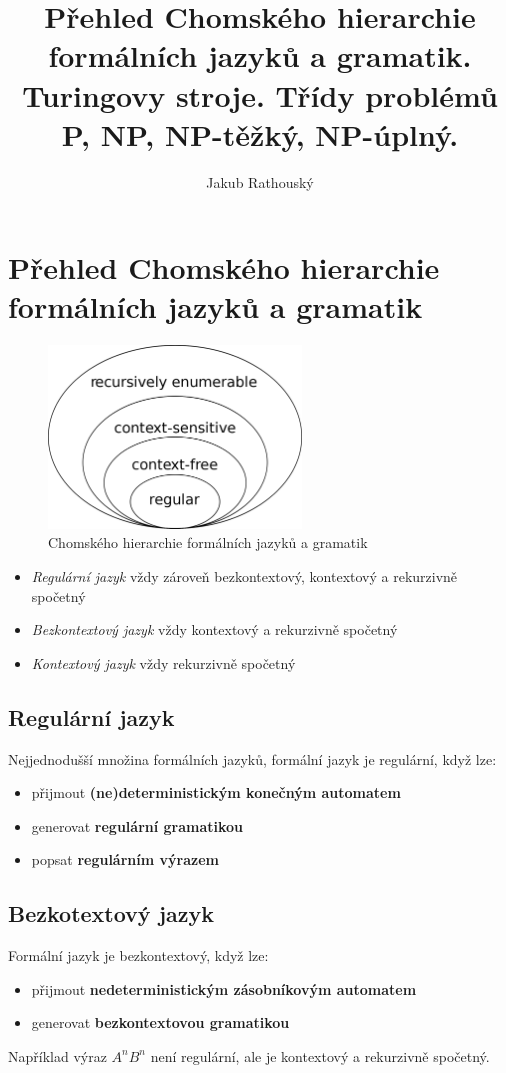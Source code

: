 \documentclass{szzclass}
\title{Přehled Chomského hierarchie formálních jazyků a gramatik. Turingovy stroje. Třídy problémů P, NP, NP-těžký, NP-úplný.}
\author{Jakub Rathouský}
\begin{document}
\maketitle
\tableofcontents
\newpage

\section{Přehled Chomského hierarchie formálních ja\-zyků a gramatik}

\begin{figure}[ht]
    \centering
    \includegraphics[width=0.6\textwidth]{topics/bi-spol-01/images/Chomsky_hierarchy.png}
    \caption{Chomského hierarchie formálních jazyků a gramatik}
\end{figure}

\begin{itemize}
\item\textit{Regulární jazyk}
vždy zároveň bezkontextový, kontextový a rekurzivně spočetný
\item\textit{Bezkontextový jazyk}
vždy kontextový a rekurzivně spočetný
\item\textit{Kontextový jazyk}
vždy rekurzivně spočetný
\end{itemize}

\subsection{Regulární jazyk}
Nejjednodušší množina formálních jazyků, formální jazyk je regulární, když lze:
\begin{itemize}
\item přijmout \textbf{(ne)deterministickým konečným automatem}
\item generovat \textbf{regulární gramatikou}
\item popsat \textbf{regulárním výrazem}
\end{itemize}

\subsection{Bezkotextový jazyk}
Formální jazyk je bezkontextový, když lze:
\begin{itemize}
\item přijmout \textbf{nedeterministickým zásobníkovým automatem}
\item generovat \textbf{bezkontextovou gramatikou}
\end{itemize}
Například výraz $A^nB^n$ není regulární, ale je kontextový a rekurzivně spočetný.
\end{document}
